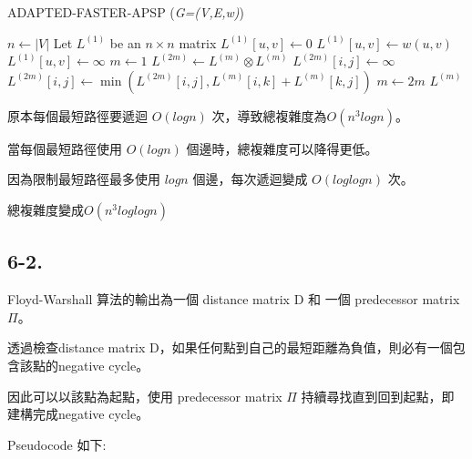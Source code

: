 \documentclass[UTF8, a4paper, 11pt]{report}
\begin{document}
\begin{algorithm}
    \caption{ADAPTED-FASTER-APSP (\textit{G=(V,E,w)})}
    \begin{algorithmic}[1]
        \State $n \gets |V|$
        \State Let $L^{(1)}$ be an $n \times n$ matrix
        \State $L^{(1)}[u, v] \gets 0$
        \State $L^{(1)}[u, v] \gets w(u, v)$
        \Else
        \State $L^{(1)}[u, v] \gets \infty$
        \EndIf
        \EndFor
        \EndFor
        \State $m \gets 1$
         
        \State $L^{(2m)} \gets L^{(m)} \otimes L^{(m)}$
        \State $L^{(2m)}[i,j] \gets \infty$
        \State $L^{(2m)}[i,j] \gets \min(L^{(2m)}[i,j], L^{(m)}[i,k] + L^{(m)}[k,j])$
        \EndFor
        \EndFor
        \EndFor
        \State $m \gets 2m$
        \EndWhile
        \State \Return $L^{(m)}$
    \end{algorithmic}
\end{algorithm}

原本每個最短路徑要遞迴 $O(log{n})$ 次，導致總複雜度為$O(n^3 log{n})$。

當每個最短路徑使用 $O(log{n})$ 個邊時，總複雜度可以降得更低。

因為限制最短路徑最多使用 $log{n}$ 個邊，每次遞迴變成 $O(log{log{n}})$ 次。

總複雜度變成$O(n^3 log{log{n}})$

\pagebreak

\subsection*{6-2.}

Floyd-Warshall 算法的輸出為一個 distance matrix D 和 一個 predecessor matrix $\Pi$。

透過檢查distance matrix D，如果任何點到自己的最短距離為負值，則必有一個包含該點的negative cycle。

因此可以以該點為起點，使用 predecessor matrix $\Pi$ 持續尋找直到回到起點，即建構完成negative cycle。

Pseudocode 如下:
\end{document}
